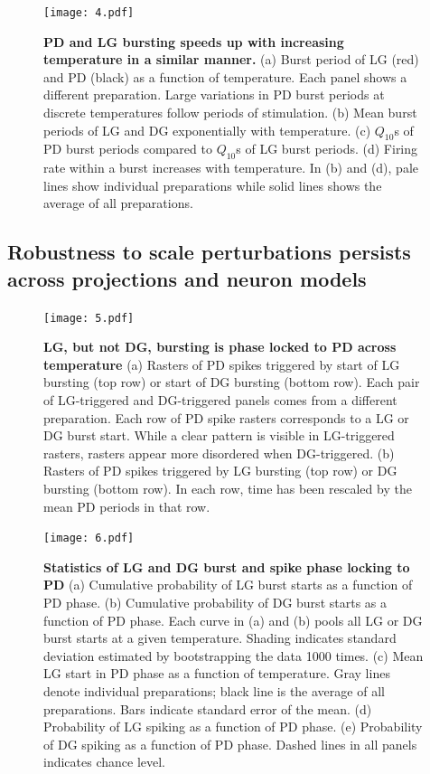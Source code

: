 \documentclass[9pt,lineno]{elife}
\begin{document}
\begin{figure}[!hbp]
\centering
\begin{fullwidth}
\texttt{[image: 4.pdf]}
\end{fullwidth}
\caption{\textbf{PD and LG bursting speeds up with increasing temperature in a similar manner.} (a) Burst period of  LG (red) and PD (black) as a function of temperature. Each panel shows a different preparation. Large variations in PD burst periods at discrete temperatures follow periods of stimulation. (b) Mean burst periods of LG and DG exponentially with temperature. (c) $Q_{10}$s of PD burst periods compared to $Q_{10}$s of LG burst periods. (d) Firing rate within a burst increases with temperature. In (b) and (d), pale lines show individual preparations while solid lines shows the average of all preparations. }
\end{figure}

\lipsum[3-5]

\subsection{Robustness to scale perturbations persists across projections and neuron models}

\begin{figure}[!hbp]
\centering
\begin{fullwidth}
\texttt{[image: 5.pdf]}
\end{fullwidth}
\caption{\textbf{LG, but not DG, bursting is phase locked to PD across temperature} (a) Rasters of PD spikes triggered by start of LG bursting (top row) or start of DG bursting (bottom row). Each pair of LG-triggered and DG-triggered panels comes from a different preparation. Each row of PD spike rasters corresponds to a LG or DG burst start. While a clear pattern is visible in LG-triggered rasters, rasters appear more disordered when DG-triggered. (b) Rasters of PD spikes triggered by LG bursting (top row) or DG bursting (bottom row). In each row, time has been rescaled by the mean PD periods in that row.}
\end{figure}

\lipsum[2-4]

\begin{figure}[!htp]
\centering
\begin{fullwidth}
\texttt{[image: 6.pdf]}
\end{fullwidth}
\caption{\textbf{Statistics of LG and DG burst and spike phase locking to PD} (a) Cumulative probability of LG burst starts as a function of PD phase.  (b) Cumulative probability of DG burst starts as a function of PD phase. Each curve in (a) and (b) pools all LG or DG burst starts at a given temperature. Shading indicates standard deviation estimated by bootstrapping the data 1000 times.  (c) Mean LG start in PD phase as a function of temperature. Gray lines denote individual preparations; black line is the average of all preparations. Bars indicate standard error of the mean. (d) Probability of LG spiking as a function of PD phase. (e) Probability of DG spiking as a function of PD phase.  Dashed lines in all panels indicates chance level.}
\end{figure}
\end{document}
